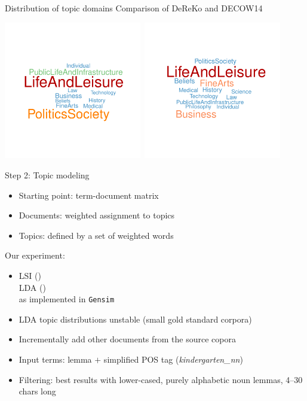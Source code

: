 \documentclass{beamer}
\begin{document}
\begin{frame}
  {Distribution of topic domains}
  Comparison of DeReKo and DECOW14\\[1cm]
  \begin{center}
    \includegraphics[width=0.45\textwidth]{graphics/dereko-cowcat}~\includegraphics[width=0.45\textwidth]{graphics/cow-cowcat}
  \end{center}
\end{frame}

\begin{frame}
  {Step 2: Topic modeling}

  \begin{itemize}
    \item Starting point: term-document matrix
    \item Documents: weighted assignment to topics
    \item Topics: defined by a set of weighted words
  \end{itemize}
\pause
  Our experiment:
  \begin{itemize}
    \item LSI (\citealp{LandauerDumais1994})\\
          LDA (\citealp{BleiEa2003})\\
          as implemented in \texttt{Gensim} \citep{RehurekSojka2010}%
    \item LDA topic distributions unstable (small gold standard corpora)
    \item Incrementally add other documents from the source copora
     \vspace{.25cm}
\pause
    \item Input terms: lemma $+$ simplified POS tag (\textit{kindergarten\_nn}) 
    \item Filtering: best results with lower-cased, purely alphabetic noun lemmas, 4--30 chars long
    \end{itemize}
\end{frame}
\end{document}
